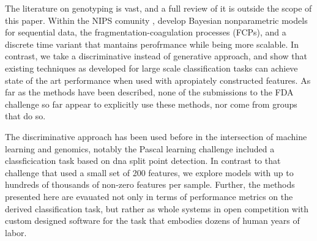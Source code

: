 \documentclass{article}
\begin{document}




The literature on genotyping is vast, and a full review of it is outside the scope of this paper.
Within the NIPS comunity \cite{teh2011modelling}, develop Bayesian nonparametric models for sequential data, the fragmentation-coagulation processes (FCPs), and a discrete time variant that mantains perofrmance while being more scalable. \cite{elliott2012scalable}
In contrast, we take a discriminative instead of generative approach, and show that existing techniques as developed for large scale classification tasks can achieve state of the art performance when used with apropiately constructed features. 
As far as the methods have been described, none of the submissions to the FDA challenge so far appear to explicitly use these methods, nor come from groups that do so.

The discriminative approach has been used before in the intersection of machine learning and genomics, notably the Pascal learning challenge included a classficication task based on dna split point detection.
In contrast to that challenge that used a small set of 200 features, we explore models with up to hundreds of thousands of non-zero features per sample.
Further, the methods presented here are evauated not only in terms of performance metrics on the derived classification task, but rather as whole systems in open competition with custom designed software for the task that embodies dozens of human years of labor.
\end{document}
